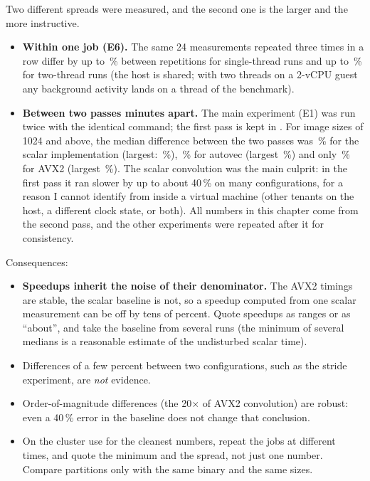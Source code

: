 Two different spreads were measured, and the second one is the larger and the more instructive.
\begin{itemize}
\item \textbf{Within one job (E6).} The same 24 measurements repeated three times in a row differ by up to \repSpreadOne\,\% between repetitions for single-thread runs and up to \repSpreadTwo\,\% for two-thread runs (the host is shared; with two threads on a 2-vCPU guest any background activity lands on a thread of the benchmark).
\item \textbf{Between two passes minutes apart.} The main experiment (E1) was run twice with the identical command; the first pass is kept in . For image sizes of 1024 and above, the median difference between the two passes was \betweenScalarMed\,\% for the scalar implementation (largest: \betweenScalarMax\,\%), \betweenAutovecMed\,\% for autovec (largest \betweenAutovecMax\,\%) and only \betweenAvxMed\,\% for AVX2 (largest \betweenAvxMax\,\%). The scalar convolution was the main culprit: in the first pass it ran slower by up to about 40\,\% on many configurations, for a reason I cannot identify from inside a virtual machine (other tenants on the host, a different clock state, or both). All numbers in this chapter come from the second pass, and the other experiments were repeated after it for consistency.
\end{itemize}
Consequences:
\begin{itemize}
\item \textbf{Speedups inherit the noise of their denominator.} The AVX2 timings are stable, the scalar baseline is not, so a speedup computed from one scalar measurement can be off by tens of percent. Quote speedups as ranges or as ``about'', and take the baseline from several runs (the minimum of several medians is a reasonable estimate of the undisturbed scalar time).
\item Differences of a few percent between two configurations, such as the stride experiment, are \emph{not} evidence.
\item Order-of-magnitude differences (the 20$\times$ of AVX2 convolution) are robust: even a 40\,\% error in the baseline does not change that conclusion.
\item On the cluster use  for the cleanest numbers, repeat the jobs at different times, and quote the minimum and the spread, not just one number. Compare partitions only with the same binary and the same sizes.
\end{itemize}

